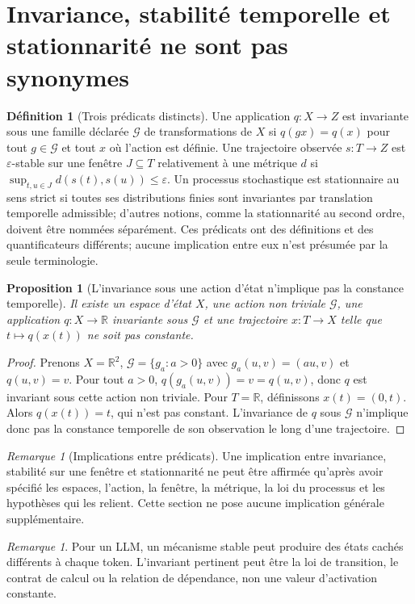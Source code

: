 \documentclass[11pt,oneside]{book}
\newtheorem{proposition}[theoreme]{Proposition}
\theoremstyle{definition}
\newtheorem{definition}[theoreme]{Définition}
\theoremstyle{remark}
\newtheorem{remarque}[theoreme]{Remarque}
\newcommand{\1}{\mathbf 1}
\begin{document}
\section{Invariance, stabilité temporelle et stationnarité ne sont pas synonymes}
\begin{definition}[Trois prédicats distincts]
Une application $q:X\to Z$ est invariante sous une famille déclarée $\mathcal G$ de transformations de $X$ si $q(gx)=q(x)$ pour tout $g\in\mathcal G$ et tout $x$ où l'action est définie. Une trajectoire observée $s:T\to Z$ est $\varepsilon$-stable sur une fenêtre $J\subseteq T$ relativement à une métrique $d$ si $\sup_{t,u\in J}d(s(t),s(u))\leq\varepsilon$. Un processus stochastique est stationnaire au sens strict si toutes ses distributions finies sont invariantes par translation temporelle admissible; d'autres notions, comme la stationnarité au second ordre, doivent être nommées séparément. Ces prédicats ont des définitions et des quantificateurs différents; aucune implication entre eux n'est présumée par la seule terminologie.
\end{definition}
\begin{proposition}[L'invariance sous une action d'état n'implique pas la constance temporelle]
Il existe un espace d'état $X$, une action non triviale $\mathcal G$, une application $q:X\to\mathbb R$ invariante sous $\mathcal G$ et une trajectoire $x:T\to X$ telle que $t\mapsto q(x(t))$ ne soit pas constante.
\end{proposition}
\begin{proof}
Prenons $X=\mathbb R^2$, $\mathcal G=\{g_a:a>0\}$ avec $g_a(u,v)=(au,v)$ et $q(u,v)=v$. Pour tout $a>0$, $q(g_a(u,v))=v=q(u,v)$, donc $q$ est invariant sous cette action non triviale. Pour $T=\mathbb R$, définissons $x(t)=(0,t)$. Alors $q(x(t))=t$, qui n'est pas constant. L'invariance de $q$ sous $\mathcal G$ n'implique donc pas la constance temporelle de son observation le long d'une trajectoire.
\end{proof}
\begin{remarque}[Implications entre prédicats]
Une implication entre invariance, stabilité sur une fenêtre et stationnarité ne peut être affirmée qu'après avoir spécifié les espaces, l'action, la fenêtre, la métrique, la loi du processus et les hypothèses qui les relient. Cette section ne pose aucune implication générale supplémentaire.
\end{remarque}
\begin{remarque}
Pour un LLM, un mécanisme stable peut produire des états cachés différents à chaque token. L'invariant pertinent peut être la loi de transition, le contrat de calcul ou la relation de dépendance, non une valeur d'activation constante.
\end{remarque}
\end{document}
